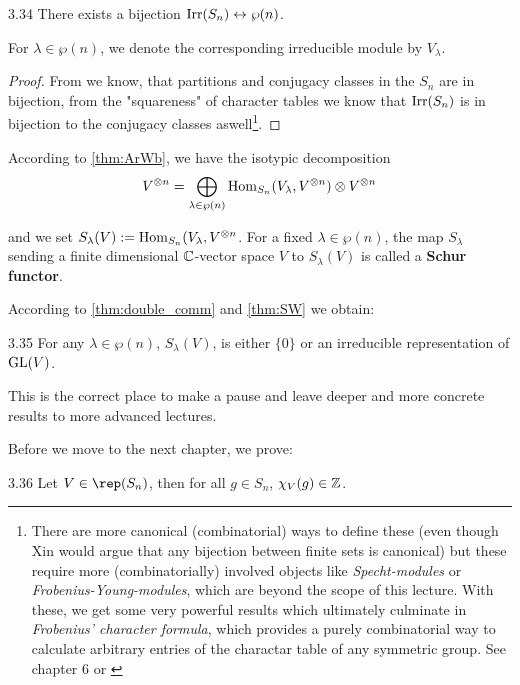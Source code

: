 \documentclass[twoside = false,	%
		headsepline,		%
		parskip = true,
		]{scrbook}						%
\begin{document}
        \begin{lemma}{}{3.34}
            There exists a bijection $\mathrm{Irr}(S_n) \leftrightarrow \wp(n)$.

            For $\lambda \in \wp(n)$, we denote the corresponding irreducible module by $V_\lambda$.
        \end{lemma}

        \begin{proof}
            From \cite{LA} we know, that partitions and conjugacy classes in the $S_n$ are in bijection, from the "squareness" of character tables we know that $\mathrm{Irr}(S_n)$ is in bijection to the conjugacy classes aswell\footnote{There are more canonical (combinatorial) ways to define these (even though Xin would argue that any bijection between finite sets is canonical) but these require more (combinatorially) involved objects like \textit{Specht-modules} or \textit{Frobenius-Young-modules}, which are beyond the scope of this lecture. With these, we get some very powerful results which ultimately culminate in \textit{Frobenius' character formula}, which provides a purely combinatorial way to calculate arbitrary entries of the charactar table of any symmetric group. See \cite{FultonHarris.1991} chapter 6 or \cite{Flag}}.
        \end{proof}

        According to \ref{thm:ArWb}, we have the isotypic decomposition $$V^{\otimes n}= \bigoplus_{\lambda\in\wp(n)} \mathrm{Hom}_{S_n}(V_\lambda, V^{\otimes n})\otimes V^{\otimes n}$$

        and we set $S_\lambda(V):=\mathrm{Hom}_{S_n}(V_\lambda, V^{\otimes n}$. For a fixed $\lambda\in\wp(n)$, the map $S_\lambda$ sending a finite dimensional $\mathbb C$-vector space $V$ to $S_\lambda(V)$ is called a \textbf{Schur functor}.

        According to \ref{thm:double_comm} and \ref{thm:SW} we obtain:

        \begin{corollary}{}{3.35}
            For any $\lambda \in \wp(n)$, $S_\lambda(V)$, is either $\{0\}$ or an irreducible representation of $\mathrm{GL}(V)$.
        \end{corollary}

        This is the correct place to make a pause and leave deeper and more concrete results to more advanced lectures.

        Before we move to the next chapter, we prove:

        \begin{proposition}{}{3.36}
            Let $V \in \rep(S_n)$, then for all $g \in S_n$, $\chi_V(g) \in \mathbb Z$.
        \end{proposition}
\end{document}
